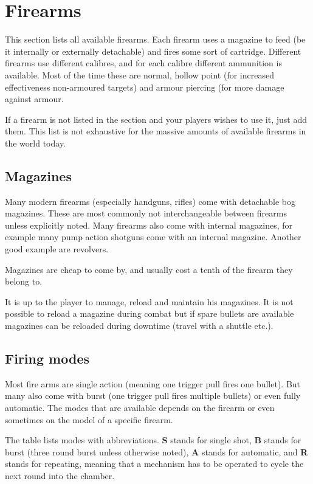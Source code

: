 \section{Firearms}
\label{sec:10-Firearms}

This section lists all available firearms. Each firearm uses a magazine to feed
(be it internally or externally detachable) and fires some sort of cartridge.
Different firearms use different calibres, and for each calibre different
ammunition is available. Most of the time these are normal, hollow point (for
increased effectiveness non-armoured targets) and armour piercing (for more
damage against armour.

If a firearm is not listed in the section and your players wishes to use it,
just add them. This list is not exhaustive for the massive amounts of available
firearms in the world today.

\subsection{Magazines}
\label{sub:10-Magazines}

Many modern firearms (especially handguns, rifles) come with detachable bog
magazines. These are most commonly not interchangeable between firearms unless
explicitly noted. Many firearms also come with internal magazines, for example
many pump action shotguns come with an internal magazine. Another good example
are revolvers.

Magazines are cheap to come by, and usually cost a tenth of the firearm they
belong to.

It is up to the player to manage, reload and maintain his magazines. It is not
possible to reload a magazine during combat but if spare bullets are available
magazines can be reloaded during downtime (travel with a shuttle etc.).

\subsection{Firing modes}
\label{sub:10-Firing modes}

Most fire arms are single action (meaning one trigger pull fires one bullet).
But many also come with burst (one trigger pull fires multiple bullets) or
even fully automatic. The modes that are available depends on the firearm or
even sometimes on the model of a specific firearm.

The table lists modes with abbreviations. \textbf{S} stands for single shot,
\textbf{B} stands for burst (three round burst unless otherwise noted),
\textbf{A} stands for automatic, and \textbf{R} stands for repeating, meaning
that a mechanism has to be operated to cycle the next round into the chamber.

